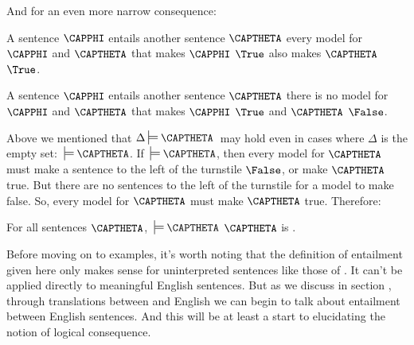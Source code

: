 \noindent{}And for an even more narrow consequence:

\begin{cenumerate}
\item A sentence $\CAPPHI$ {entails} another sentence $\CAPTHETA$ \Iff every model for $\CAPPHI$ and $\CAPTHETA$ that makes $\CAPPHI$ $\True$ also makes $\CAPTHETA$ $\True$.
\item A sentence $\CAPPHI$ {entails} another sentence $\CAPTHETA$ \Iff there is no model for $\CAPPHI$ and $\CAPTHETA$ that makes $\CAPPHI$ $\True$ and $\CAPTHETA$ $\False$.
\end{cenumerate}


\noindent{}Above we mentioned that \:$\Delta\sdtstile{}{}\CAPTHETA\:$ may hold even in cases where $\Delta$ is the empty set: $\:\sdtstile{}{}\CAPTHETA$.  If $\:\sdtstile{}{}\CAPTHETA$, then every model for $\CAPTHETA$ must make a sentence to the left of the turnstile $\False$, or make $\CAPTHETA$ true. 
But there are no sentences to the left of the turnstile for a model to make false. 
So, every model for $\CAPTHETA$ must make $\CAPTHETA$ true. 
Therefore:
\begin{THEOREM}{}
For all \GSL{} sentences $\CAPTHETA$, $\:\sdtstile{}{}\CAPTHETA$ \Iff $\CAPTHETA$ is .
\end{THEOREM} 
\noindent{}Before moving on to examples, it's worth noting that the definition of entailment given here only makes sense for uninterpreted sentences like those of \GSL{}.
It can't be applied directly to meaningful English sentences. 
But as we discuss in section , through translations between \GSL{} and English we can begin to talk about entailment between English sentences. 
And this will be at least a start to elucidating the notion of logical consequence.

